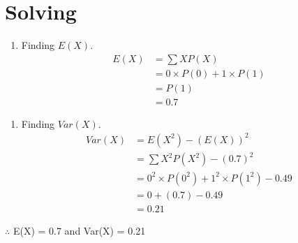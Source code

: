 \documentclass{beamer}
\begin{document}
\section{Solving}
\begin{frame}
\begin{enumerate}
\item Finding $E(X)$.{
\begin{align}
E(X)&=\sum XP(X) \\
&=0\times P(0)+1\times P(1) \\
&=P(1)\\
&=0.7
\end{align}
}
\end{enumerate}
 
\end{frame}
\begin{frame}
\begin{enumerate}
\item Finding $Var(X)$.{
\begin{align}
Var(X)&=E(X^2)-(E(X))^2\\
&=\sum X^2P(X^2)-(0.7)^2\\
&=0^2\times P(0^2)+1^2\times P(1^2)-0.49\\
&=0+(0.7)-0.49\\
&=0.21
\end{align}
}
\end{enumerate}

$\therefore$ E(X) = 0.7 and Var(X) = 0.21
\end{frame}
\end{document}
